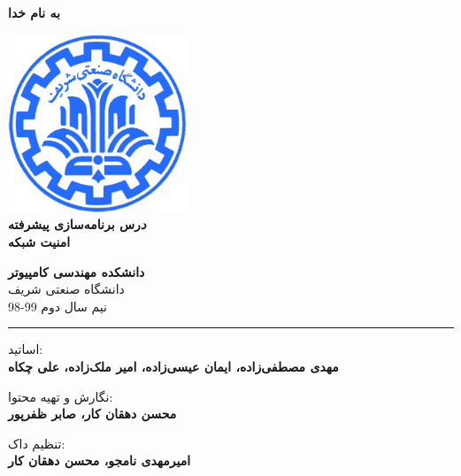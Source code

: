 \documentclass[]{article}
\begin{document}
\begin{titlepage}
\begin{center}

\textbf{ \Huge{به نام خدا} }
        
\vspace{0.2cm}

\includegraphics[width=0.4\textwidth]{sharif1.png}\\
\vspace{0.2cm}
\textbf{ \Huge{\emph درس برنامه‌سازی پیشرفته} }\\
\vspace{0.25cm}
\textbf{ \Large{امنیت شبکه} }
\vspace{0.2cm}
       
 
      \large \textbf{دانشکده مهندسی کامپیوتر}\\\vspace{0.1cm}
    \large   دانشگاه صنعتی شریف\\\vspace{0.2cm}
       \large   ﻧﯿﻢ سال دوم 99-98 \\\vspace{0.10cm}
      \noindent\rule[1ex]{\linewidth}{1pt}
اساتید:\\
    \textbf{{مهدی مصطفی‌زاده، ایمان عیسی‌زاده، امیر ملک‌زاده، علی چکاه}}



        \vspace{0.10cm}
نگارش و تهیه محتوا:\\
    \textbf{{محسن دهقان کار، صابر ظفرپور}}
    
       \vspace{0.10cm}
       تنظیم داک:\\
    \textbf{{امیرمهدی نامجو، محسن دهقان کار}}

    
        \vspace{0.05cm}
    

\end{center}
\end{titlepage}
\end{document}
